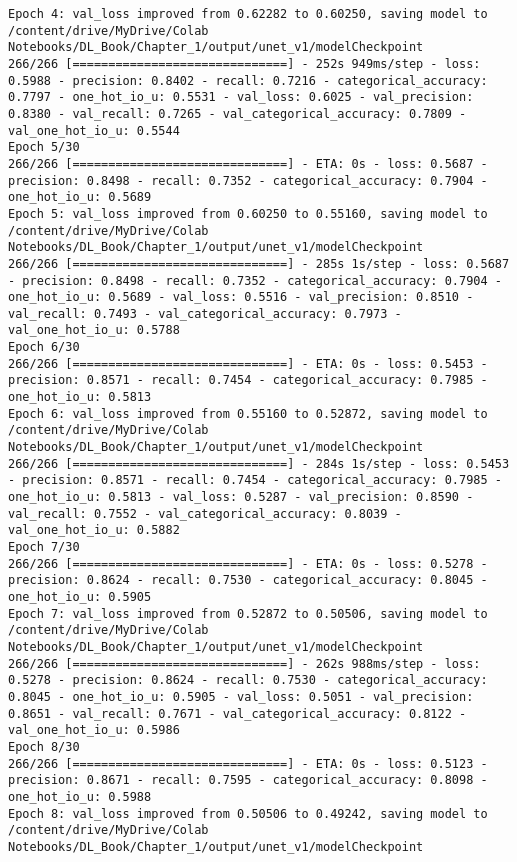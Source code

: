\documentclass[
  letterpaper,
  DIV=11,
  numbers=noendperiod]{scrreprt}
\begin{document}
\begin{verbatim}
Epoch 4: val_loss improved from 0.62282 to 0.60250, saving model to /content/drive/MyDrive/Colab Notebooks/DL_Book/Chapter_1/output/unet_v1/modelCheckpoint
266/266 [==============================] - 252s 949ms/step - loss: 0.5988 - precision: 0.8402 - recall: 0.7216 - categorical_accuracy: 0.7797 - one_hot_io_u: 0.5531 - val_loss: 0.6025 - val_precision: 0.8380 - val_recall: 0.7265 - val_categorical_accuracy: 0.7809 - val_one_hot_io_u: 0.5544
Epoch 5/30
266/266 [==============================] - ETA: 0s - loss: 0.5687 - precision: 0.8498 - recall: 0.7352 - categorical_accuracy: 0.7904 - one_hot_io_u: 0.5689
Epoch 5: val_loss improved from 0.60250 to 0.55160, saving model to /content/drive/MyDrive/Colab Notebooks/DL_Book/Chapter_1/output/unet_v1/modelCheckpoint
266/266 [==============================] - 285s 1s/step - loss: 0.5687 - precision: 0.8498 - recall: 0.7352 - categorical_accuracy: 0.7904 - one_hot_io_u: 0.5689 - val_loss: 0.5516 - val_precision: 0.8510 - val_recall: 0.7493 - val_categorical_accuracy: 0.7973 - val_one_hot_io_u: 0.5788
Epoch 6/30
266/266 [==============================] - ETA: 0s - loss: 0.5453 - precision: 0.8571 - recall: 0.7454 - categorical_accuracy: 0.7985 - one_hot_io_u: 0.5813
Epoch 6: val_loss improved from 0.55160 to 0.52872, saving model to /content/drive/MyDrive/Colab Notebooks/DL_Book/Chapter_1/output/unet_v1/modelCheckpoint
266/266 [==============================] - 284s 1s/step - loss: 0.5453 - precision: 0.8571 - recall: 0.7454 - categorical_accuracy: 0.7985 - one_hot_io_u: 0.5813 - val_loss: 0.5287 - val_precision: 0.8590 - val_recall: 0.7552 - val_categorical_accuracy: 0.8039 - val_one_hot_io_u: 0.5882
Epoch 7/30
266/266 [==============================] - ETA: 0s - loss: 0.5278 - precision: 0.8624 - recall: 0.7530 - categorical_accuracy: 0.8045 - one_hot_io_u: 0.5905
Epoch 7: val_loss improved from 0.52872 to 0.50506, saving model to /content/drive/MyDrive/Colab Notebooks/DL_Book/Chapter_1/output/unet_v1/modelCheckpoint
266/266 [==============================] - 262s 988ms/step - loss: 0.5278 - precision: 0.8624 - recall: 0.7530 - categorical_accuracy: 0.8045 - one_hot_io_u: 0.5905 - val_loss: 0.5051 - val_precision: 0.8651 - val_recall: 0.7671 - val_categorical_accuracy: 0.8122 - val_one_hot_io_u: 0.5986
Epoch 8/30
266/266 [==============================] - ETA: 0s - loss: 0.5123 - precision: 0.8671 - recall: 0.7595 - categorical_accuracy: 0.8098 - one_hot_io_u: 0.5988
Epoch 8: val_loss improved from 0.50506 to 0.49242, saving model to /content/drive/MyDrive/Colab Notebooks/DL_Book/Chapter_1/output/unet_v1/modelCheckpoint

\end{verbatim}
\end{document}
